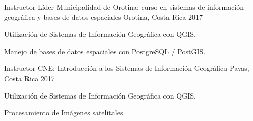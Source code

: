 \begin{cventries}
  \cventry
  {Instructor Líder} %
  {Municipalidad de Orotina: curso en sistemas de
    información geográfica y  bases de datos espaciales}
  {Orotina, Costa Rica} %
  {2017} %
  {
    \begin{cvitems} %
      \item Utilización de Sistemas de Información Geográfica con QGIS.
      \item Manejo de bases de datos espaciales con PostgreSQL / PostGIS.
    \end{cvitems}
  }

  \cventry
  {Instructor} %
  {CNE: Introducción a los Sistemas de Información Geográfica}
  {Pavas, Costa Rica} %
  {2017} %
  {
    \begin{cvitems} %
      \item Utilización de Sistemas de Información Geográfica con QGIS.
      \item Procesamiento de Imágenes satelitales.
    \end{cvitems}
  }

\end{cventries}
